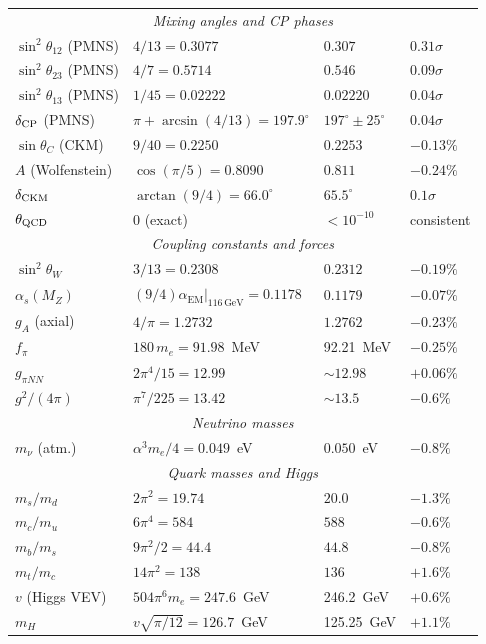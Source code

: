 \documentclass[aps,prd,twocolumn,superscriptaddress,nofootinbib,longbibliography]{revtex4-2}
\newcommand{\aEM}{\alpha_{\mathrm{EM}}}
\begin{document}
\begin{table}[t]
\begin{ruledtabular}
\begin{tabular}{llll}
\multicolumn{4}{c}{\textit{Mixing angles and CP phases}} \\[3pt]
$\sin^2\theta_{12}$ (PMNS) & $4/13 = 0.3077$ & $0.307$
  & $0.31\sigma$ \\
$\sin^2\theta_{23}$ (PMNS) & $4/7 = 0.5714$ & $0.546$
  & $0.09\sigma$ \\
$\sin^2\theta_{13}$ (PMNS) & $1/45 = 0.02222$ & $0.02220$
  & $0.04\sigma$ \\
$\delta_{\rm CP}$ (PMNS) & $\pi + \arcsin(4/13) = 197.9^\circ$
  & $197^\circ \pm 25^\circ$ & $0.04\sigma$ \\
$\sin\theta_C$ (CKM) & $9/40 = 0.2250$ & $0.2253$ & $-0.13\%$ \\
$A$ (Wolfenstein) & $\cos(\pi/5) = 0.8090$ & $0.811$ & $-0.24\%$ \\
$\delta_{\rm CKM}$ & $\arctan(9/4) = 66.0^\circ$
  & $65.5^\circ$ & $0.1\sigma$ \\
$\theta_{\rm QCD}$ & $0$ (exact) & $< 10^{-10}$ & consistent \\[6pt]
\multicolumn{4}{c}{\textit{Coupling constants and forces}} \\[3pt]
$\sin^2\theta_W$ & $3/13 = 0.2308$ & $0.2312$ & $-0.19\%$ \\
$\alpha_s(M_Z)$ & $(9/4)\aEM|_{116\,\text{GeV}} = 0.1178$
  & $0.1179$ & $-0.07\%$ \\
$g_A$ (axial) & $4/\pi = 1.2732$ & $1.2762$ & $-0.23\%$ \\
$f_\pi$ & $180\,m_e = 91.98$~MeV & 92.21~MeV & $-0.25\%$ \\
$g_{\pi NN}$ & $2\pi^4/15 = 12.99$ & $\sim\!12.98$ & $+0.06\%$ \\
$g^2/(4\pi)$ & $\pi^7/225 = 13.42$ & $\sim\!13.5$ & $-0.6\%$ \\[6pt]
\multicolumn{4}{c}{\textit{Neutrino masses}} \\[3pt]
$m_\nu$ (atm.) & $\alpha^3 m_e/4 = 0.049$~eV
  & $0.050$~eV & $-0.8\%$ \\[6pt]
\multicolumn{4}{c}{\textit{Quark masses and Higgs}} \\[3pt]
$m_s/m_d$ & $2\pi^2 = 19.74$ & $20.0$ & $-1.3\%$ \\
$m_c/m_u$ & $6\pi^4 = 584$ & $588$ & $-0.6\%$ \\
$m_b/m_s$ & $9\pi^2/2 = 44.4$ & $44.8$ & $-0.8\%$ \\
$m_t/m_c$ & $14\pi^2 = 138$ & $136$ & $+1.6\%$ \\
$v$ (Higgs VEV) & $504\pi^6 m_e = 247.6$~GeV
  & 246.2~GeV & $+0.6\%$ \\
$m_H$ & $v\sqrt{\pi/12} = 126.7$~GeV & 125.25~GeV & $+1.1\%$ \\[6pt]

\end{tabular}
\end{ruledtabular}
\end{table}
\end{document}
